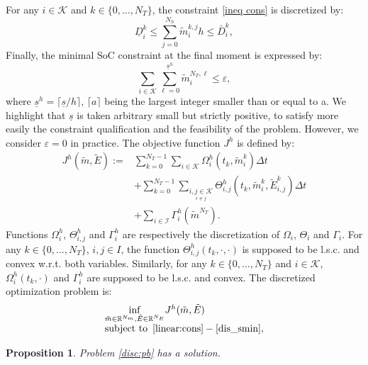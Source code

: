 \documentclass[conference]{IEEEtran}
\newtheorem{proposition}{Proposition}[section]
\def\K{\mathcal{K}}
\def\I{\mathcal{I}}
\begin{document}
 For any $i\in\K $ and $k\in\{0,\ldots,N_T\}$, the constraint \eqref{ineq cons} is discretized by:
\begin{equation}
\label{contraintes:etat}
\underline{D}_i^k\leq \sum_{j=0}^{N_h}\tilde{m}_i^{k,j}h\leq \bar{D}_i^k,
\end{equation}
Finally, the minimal SoC constraint at the final moment is expressed by:
\begin{equation}
\label{dis_smin}
\sum_{i\in\K}\sum_{\ell = 0}^{\underline{s}^h} \tilde{m}_i^{N_T,\ell} \leq \varepsilon,
\end{equation}
where $\underline{s}^h = \lceil\underline{s}/h\rceil $, $\lceil a\rceil$ being the largest integer smaller than or equal to a. We highlight that $\underline{s}$ is taken arbitrary small but strictly positive, to satisfy more easily the constraint qualification and the feasibility of the problem. However, we consider $\varepsilon = 0$ in practice. 
The objective function $J^h$ is defined by:
\begin{equation}
\label{def_Jh}
\begin{array}{ll}
 J^h(\tilde{m},\tilde{E}):=&\sum_{k=0}^{N_T-1}
 \sum_{i\in \K} \Omega^h_{i}(t_k, \tilde{m}^{k}_i)\Delta t \\
 & +\sum_{k=0}^{N_T-1}\sum_{\underset{i\neq j}{i,j\in\K }}\Theta_{i,j}^h(t_k,\tilde{m}^{k}_i,\tilde{E}^{k}_{i,j})\Delta t \\
&+\sum_{i\in\I} \Gamma_i^h(\tilde{m}^{N_T}).
\end{array}
\end{equation}
Functions $\Omega^h_i$, $\Theta^h_{i,j}$ and $\Gamma^h_i$ are respectively the discretization of $\Omega_i$, $\Theta_i$ and $\Gamma_i$.
For any $k\in\{0,\ldots, N_T\}$, $i,j\in I$, the function $\Theta^h_{i,j}(t_k,\cdot,\cdot)$ is supposed to be l.s.c. and convex w.r.t. both variables.
Similarly, for any $k\in\{0,\ldots, N_T\}$ and $i\in \mathcal{K}$, $\Omega_i^h(t_k,\cdot)$ and $\Gamma_i^h$ are supposed to be l.s.c. and convex.
The discretized optimization problem is:
\begin{equation}
\label{disc:pb}
\begin{array}{l}
 \underset{\tilde{m}\in\mathbb{R}^{N_m},\tilde{E}\in\mathbb{R}^{N_E}}{\inf}J^h(\tilde{m},\tilde{E}) \\
 \mbox{subject to }\, \eqref{linear:cons}-\eqref{dis_smin},
\end{array}
\end{equation}


\begin{proposition}
\label{existence_sol}
Problem \eqref{disc:pb} has a solution.
\end{proposition}
\end{document}
